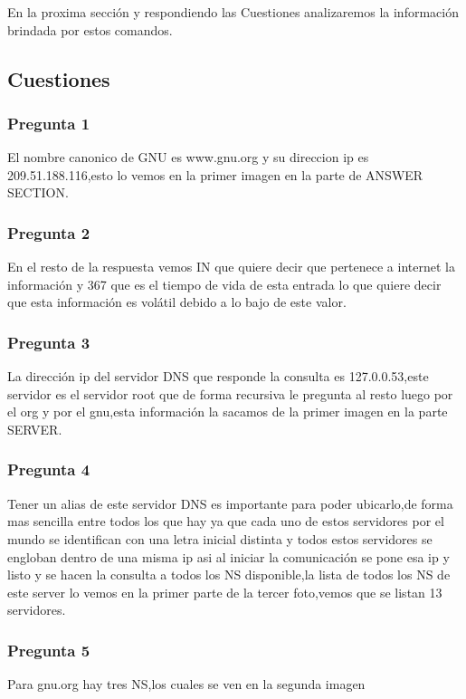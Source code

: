 \documentclass{article}
\begin{document}
En la proxima sección y respondiendo las Cuestiones analizaremos la información brindada por estos comandos.

\newpage

\subsection{Cuestiones}

\subsubsection{Pregunta 1}
El nombre canonico de GNU es www.gnu.org y su direccion ip es 209.51.188.116,esto lo vemos en la primer imagen en la parte de ANSWER SECTION.

\subsubsection{Pregunta 2}
En el resto de la respuesta vemos IN que quiere decir que pertenece a internet la información y 367 que es el tiempo de vida de esta entrada lo que quiere decir que esta información es volátil debido a lo bajo de este valor.

\subsubsection{Pregunta 3}
La dirección ip del servidor DNS que responde la consulta es 127.0.0.53,este servidor es el servidor root que de forma recursiva le pregunta al resto luego por el org  y por el gnu,esta información la sacamos de la primer imagen en la parte SERVER.

\subsubsection{Pregunta 4}
Tener un alias de este servidor DNS es importante para poder ubicarlo,de forma mas sencilla entre todos los que hay ya que cada uno de estos servidores por el mundo se identifican con una letra inicial distinta y todos estos servidores se engloban dentro de una misma ip asi al iniciar la comunicación se pone esa ip y listo y se hacen la consulta a todos los NS disponible,la lista de todos los NS de este server lo vemos en la primer parte de la tercer foto,vemos que se listan 13 servidores.

\subsubsection{Pregunta 5}
Para gnu.org hay tres NS,los cuales se ven en la segunda imagen
\end{document}
